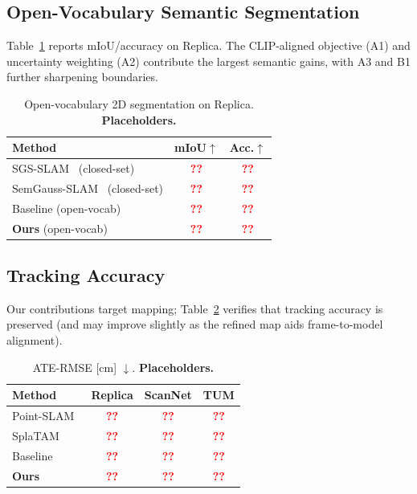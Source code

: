 \documentclass[10pt, journal]{IEEEtran}
\newcommand{\tofill}{\textcolor{red}{\textbf{??}}}
\newcommand{\best}[1]{\textbf{#1}}
\begin{document}
\subsection{Open-Vocabulary Semantic Segmentation}
Table~\ref{tab:sem} reports mIoU/accuracy on Replica. The CLIP-aligned objective
(A1) and uncertainty weighting (A2) contribute the largest semantic gains, with
A3 and B1 further sharpening boundaries.

\begin{table}[t]
\centering
\caption{Open-vocabulary 2D segmentation on Replica. \textbf{Placeholders.}}
\label{tab:sem}
\begin{tabular}{lcc}
\toprule
Method & mIoU$\uparrow$ & Acc.$\uparrow$ \\
\midrule
SGS-SLAM~\cite{li2024sgsslam} (closed-set)       & \tofill & \tofill \\
SemGauss-SLAM~\cite{zhu2024semgauss} (closed-set)& \tofill & \tofill \\
Baseline (open-vocab)                            & \tofill & \tofill \\
\textbf{Ours} (open-vocab)                       & \best{\tofill} & \best{\tofill} \\
\bottomrule
\end{tabular}
\end{table}

\subsection{Tracking Accuracy}
Our contributions target mapping; Table~\ref{tab:ate} verifies that tracking
accuracy is preserved (and may improve slightly as the refined map aids
frame-to-model alignment).

\begin{table}[t]
\centering
\caption{ATE-RMSE [cm] $\downarrow$. \textbf{Placeholders.}}
\label{tab:ate}
\begin{tabular}{lccc}
\toprule
Method & Replica & ScanNet & TUM \\
\midrule
Point-SLAM~\cite{sandstrom2023pointslam} & \tofill & \tofill & \tofill \\
SplaTAM~\cite{keetha2024splatam}         & \tofill & \tofill & \tofill \\
Baseline                                 & \tofill & \tofill & \tofill \\
\textbf{Ours}                            & \tofill & \tofill & \tofill \\
\bottomrule
\end{tabular}
\end{table}
\end{document}
